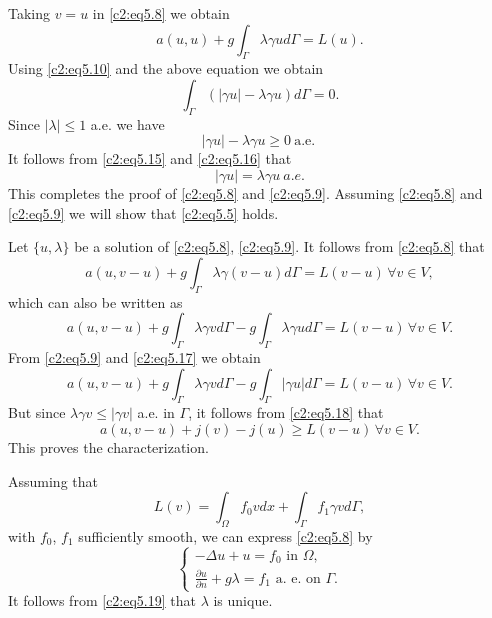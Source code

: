  Taking $v=u$ in \eqref{c2:eq5.8} we obtain 
 $$
 a(u, u) + g \int_\Gamma  \lambda \gamma u d \Gamma = L(u). 
 $$
 Using \eqref{c2:eq5.10} and the above equation we obtain 
 \begin{equation}
\int_\Gamma (|\gamma u| - \lambda \gamma u) d \Gamma = 0.\tag{5.15}\label{c2:eq5.15} 
 \end{equation} 
 Since $|\lambda|\leq 1$ a.e. we have 
 \begin{equation}
|\gamma u| - \lambda \gamma u \geq 0 ~\text{a.e.}~ \tag{5.16}\label{c2:eq5.16} 
 \end{equation} 
 It follows from \eqref{c2:eq5.15} and \eqref{c2:eq5.16} that 
 $$
 |\gamma u | = \lambda \gamma u~ a.e. 
 $$
 This completes the proof of \eqref{c2:eq5.8} and \eqref{c2:eq5.9}. 
Assuming \eqref{c2:eq5.8} and \eqref{c2:eq5.9}
 we will show that \eqref{c2:eq5.5} holds. 
 
 Let $\{u, \lambda\}$ be a solution of \eqref{c2:eq5.8},
 \eqref{c2:eq5.9}.  It follows from \eqref{c2:eq5.8} that 
 $$
 a(u, v-u) +g \int_\Gamma \lambda \gamma (v - u) d\Gamma  = L (v - u)
\, \forall  v \in V,  
 $$
 which can also be written as 
 \begin{equation}
a(u, v-u) + g \int_\Gamma \lambda \gamma v d \Gamma - g \int_\Gamma
\lambda \gamma u d \Gamma = L(v-u)\, \forall  v \in
V. \tag{5.17}\label{c2:eq5.17}  
 \end{equation} 
 From \eqref{c2:eq5.9} and \eqref{c2:eq5.17} we obtain 
 \begin{equation}
a(u, v-u) +g \int_\Gamma  \lambda \gamma v d \Gamma - g \int_\Gamma
|\gamma u| d \Gamma = L (v-u)\, \forall  v \in V. \tag{5.18}\label{c2:eq5.18} 
 \end{equation} 
 But since $\lambda \gamma v \leq | \gamma v |$ a.e. in $\Gamma$, it
 follows from \eqref{c2:eq5.18} that  
 $$
 a(u, v-u) + j (v) - j(u) \geq  L(v-u)\, \forall  v \in V. 
 $$\pageoriginale 
 This proves the characterization.

 \begin{remark}\label{c2:rem5.4}%
 Assuming that 
 $$
 L(v) = \int_\Omega f_0 v dx + \int_\Gamma  f_1 \gamma v d\Gamma,
 $$  
 with $f_0$, $f_1$ sufficiently smooth, we can express \eqref{c2:eq5.8} by 
\begin{equation}
\begin{cases}
-\Delta u+u = f_0 \text{ in } \Omega,\\
\frac{\partial u}{\partial n}+ g \lambda = f_1  \text{ a. e. on }
\Gamma. \tag{5.19}\label{c2:eq5.19} 
\end{cases}
 \end{equation}
 It follows from \eqref{c2:eq5.19} that $\lambda$ is unique.
 \end{remark}  
 
